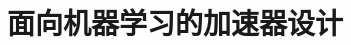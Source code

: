 \documentclass[../../main.tex]{subfiles}
\begin{document}
\chapter{面向机器学习的加速器设计}
\label{ch:07-ai-accelerator}




\end{document}
